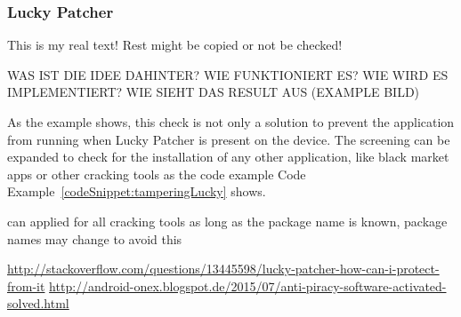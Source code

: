 \subsubsection{Lucky Patcher} \label{subsection:counter-improve-tampering-luckypatcher}
This is my real text! Rest might be copied or not be checked!



WAS IST DIE IDEE DAHINTER? WIE FUNKTIONIERT ES? WIE WIRD ES IMPLEMENTIERT? WIE SIEHT DAS RESULT AUS (EXAMPLE BILD)\newline

As the example shows, this check is not only a solution to prevent the application from running when Lucky Patcher is present on the device. The screening can be expanded to check for the installation of any other application, like black market apps or other cracking tools as the code example Code Example~\ref{codeSnippet:tamperingLucky} shows.

can applied for all cracking tools as long as the package name is known, package names may change to avoid this

\url{http://stackoverflow.com/questions/13445598/lucky-patcher-how-can-i-protect-from-it}\newline
\url{http://android-onex.blogspot.de/2015/07/anti-piracy-software-activated-solved.html}\newline


